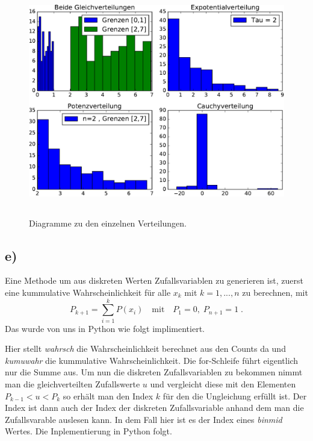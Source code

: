 \begin{figure}
  \centering
  \includegraphics[height = 10cm]{plots/A1abcd.pdf}
  \caption{Diagramme zu den einzelnen Verteilungen.}
  \label{fig:A1abcd}
\end{figure}


\subsection{e)}
Eine Methode um aus diskreten Werten Zufallsvariablen zu generieren ist, zuerst eine 
kummulative Wahrscheinlichkeit für alle $x_k$ mit $k = 1, ... ,n$ zu berechnen, mit 
\begin{equation}
P_{k+1} = \sum_{i=1} ^{k} P(x_i) \quad \text{mit} \quad P_1 = 0 , \; P_{n+1} = 1 \; .
\end{equation}
Das wurde von uns in Python wie folgt implimentiert.


Hier stellt \textit{wahrsch} die Wahrscheinlichkeit berechnet aus den Counts da und 
\textit{kumuwahr} die kummulative Wahrscheinlichkeit. Die for-Schleife führt eigentlich nur die 
Summe aus. 
Um nun die diskreten Zufallsvariablen zu bekommen nimmt man die gleichverteilten Zufallswerte $u$ 
und vergleicht diese mit den Elementen $P_{k-1} < u < P_k$ so erhält man den Index $k$ für den 
die Ungleichung erfüllt ist. Der Index ist dann auch der Index der diskreten Zufallsvariable 
anhand dem man die Zufallsvarable auslesen kann. In dem Fall hier ist es der Index eines 
\textit{binmid} Wertes. Die Inplementierung in Python folgt.
 
